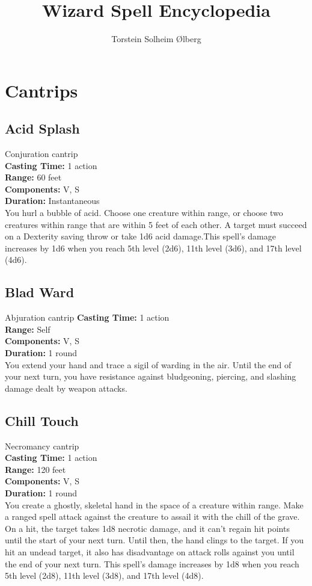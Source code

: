 \documentclass[11pt, A4paper, english]{article}
\author{Torstein Solheim Ølberg}
\title{Wizard Spell Encyclopedia}
\begin{document}
\maketitle

\tableofcontents

	\section{Cantrips}
		\subsection{Acid Splash}
Conjuration cantrip \\
\textbf{Casting Time:} 1 action \\
\textbf{Range:} 60 feet \\
\textbf{Components:} V, S \\
\textbf{Duration:} Instantaneous \\
You hurl a bubble of acid. Choose one creature within range, or choose two creatures within range that are within 5 feet of each other. A target must succeed on a Dexterity saving throw or take  1d6 acid damage.This spell's damage increases by 1d6 when you reach 5th level (2d6), 11th level (3d6), and 17th level (4d6).

		\subsection{Blad Ward}
Abjuration cantrip
\textbf{Casting Time:} 1 action \\
\textbf{Range:} Self \\
\textbf{Components:} V, S \\
\textbf{Duration:} 1 round \\
You extend your hand and trace a sigil of warding in the air. Until the end of your next turn, you have resistance against bludgeoning, piercing, and slashing damage dealt by weapon attacks.

		\subsection{Chill Touch}
Necromancy cantrip \\
\textbf{Casting Time:} 1 action \\
\textbf{Range:} 120 feet \\
\textbf{Components:} V, S \\
\textbf{Duration:} 1 round \\
You create a ghostly, skeletal hand in the space of a creature within range. Make a ranged spell attack against the creature to assail it with the chill of the grave. On a hit, the target takes 1d8 necrotic damage, and it can’t regain hit points until the start of your next turn. Until then, the hand clings to the target. If you hit an undead target, it also has disadvantage on attack rolls against you until the end of your next turn. This spell’s damage increases by 1d8 when you reach 5th level (2d8),  11th level (3d8), and 17th level (4d8).
\end{document}
